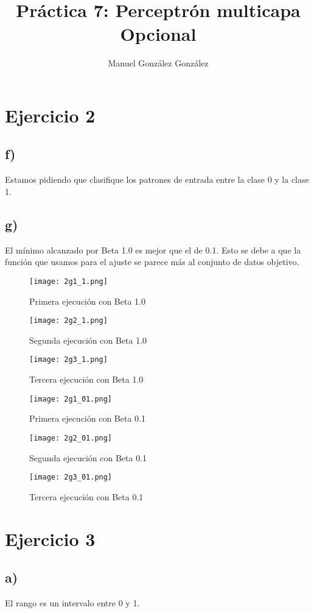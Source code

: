 \documentclass[12pt]{article}
\author{Manuel González González}
\title{Práctica 7: Perceptrón multicapa Opcional}
\begin{document}
\maketitle

\section*{Ejercicio 2}
\subsection*{f)}
Estamos pidiendo que clasifique los patrones de entrada entre la clase 0 y la clase 1.

\subsection*{g)}
El mínimo alcanzado por Beta 1.0 es mejor que el de 0.1. Esto se debe a que la función que usamos para el ajuste se parece más al conjunto de datos objetivo.

\begin{figure}
\texttt{[image: 2g1\_1.png]}
\caption{Primera ejecución con Beta 1.0}
\end{figure}
\begin{figure}
\texttt{[image: 2g2\_1.png]}
\caption{Segunda ejecución con Beta 1.0}
\end{figure}
\begin{figure}
\texttt{[image: 2g3\_1.png]}
\caption{Tercera ejecución con Beta 1.0}
\end{figure}
\begin{figure}
\texttt{[image: 2g1\_01.png]}
\caption{Primera ejecución con Beta 0.1}
\end{figure}
\begin{figure}
\texttt{[image: 2g2\_01.png]}
\caption{Segunda ejecución con Beta 0.1}
\end{figure}
\begin{figure}
\texttt{[image: 2g3\_01.png]}
\caption{Tercera ejecución con Beta 0.1}
\end{figure}
\newpage
\section*{Ejercicio 3}
\subsection*{a)}
El rango es un intervalo entre 0 y 1.
\end{document}
